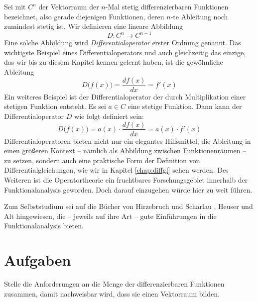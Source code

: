 Sei mit $C^n$ der Vektorraum der $n$-Mal stetig differenzierbaren Funktionen bezeichnet, also gerade diejenigen Funktionen, deren $n$-te Ableitung noch zumindest stetig ist. Wir definieren eine lineare Abbildung 
\begin{equation}
D : C^n \longrightarrow C^{n-1}
\end{equation}
Eine solche Abbildung wird \emph{Differentialoperator} erster Ordnung genannt. Das wichtigste Beispiel eines Differentialoperators und auch gleichzeitig das einzige, das wir bis zu diesem Kapitel kennen gelernt haben, ist die gewöhnliche Ableitung
\begin{equation}
D\big(f(x)\big) = \frac{d f(x)}{dx} = f'(x)
\end{equation}
Ein weiteres Beispiel ist der Differentialoperator der durch Multiplikation einer stetigen Funktion entsteht. Es sei $a\in C$ eine stetige Funktion. Dann kann der Differentialoperator $D$ wie folgt definiert sein:
\begin{equation}
D\big(f(x)\big) = a(x) \cdot \frac{d f(x)}{dx} = a(x) \cdot f'(x)
\end{equation}
Differentialoperatoren bieten nicht nur ein elegantes Hilfsmittel, die Ableitung in einen größeren Kontext -- nämlich als Abbildung zwischen Funktionenräumen -- zu setzen, sondern auch eine praktische Form der Definition von Differentialgleichungen, wie wir in Kapitel \ref{chap:diffgl} sehen werden. Des Weiteren ist die Operatortheorie ein fruchtbares Forschungsgebiet innerhalb der Funktionalanalysis geworden. Doch darauf einzugehen würde hier zu weit führen. 

Zum Selbststudium sei auf die Bücher von Hirzebruch und Scharlau \cite{HirzebruchScharlau199101}, Heuser \cite{Heuser200611} und Alt \cite{Alt201204} hingewiesen, die -- jeweils auf ihre Art -- gute Einführungen in die Funktionalanalysis bieten.

\section{Aufgaben}

\begin{prob}\label{prob:func}
Stelle die Anforderungen an die Menge der differenzierbaren Funktionen zusammen, damit nachweisbar wird, dass sie einen Vektorraum bilden.
\end{prob}

